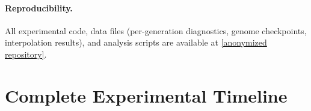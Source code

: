 \documentclass[twoside,11pt]{article}
\begin{document}
\paragraph{Reproducibility.}
All experimental code, data files (per-generation diagnostics, genome
checkpoints, interpolation results), and analysis scripts are available at
\url{[anonymized repository]}.

\vskip 0.2in


\appendix

\section{Complete Experimental Timeline}
\label{app:timeline}
\end{document}
